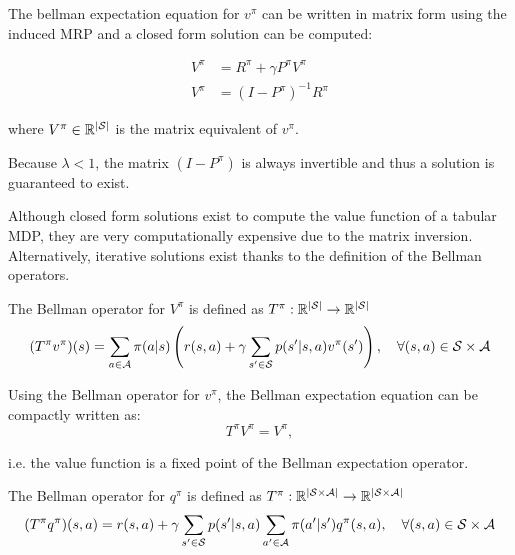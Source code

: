 The bellman expectation equation for $v^\pi$ can be written in matrix form using the induced MRP and a closed form solution can be computed:

\begin{align*}
    V^\pi &= R^\pi + \gamma P^\pi V^\pi \\
    V^\pi &= (I - P^\pi)^{-1} R^\pi
\end{align*}

where $V^\pi \in \mathbb{R}^{|\mathcal{S}|}$ is the matrix equivalent of $v^\pi$.

Because $\lambda < 1$, the matrix $(I - P^\pi)$ is always invertible and thus a solution is guaranteed to exist.


Although closed form solutions exist to compute the value function of a tabular MDP, they are very computationally expensive due to the matrix inversion.
Alternatively, iterative solutions exist thanks to the definition of the Bellman operators.


\begin{definition}
    The Bellman operator for $V^\pi$ is defined as $T^\pi : \mathbb{R}^{|\mathcal{S}|} \to \mathbb{R}^{|\mathcal{S}|}$
    \[(T^\pi v^\pi)(s) = \sum_{a \in \mathcal{A}}\pi(a|s)\left(r(s,a) + \gamma \sum_{s' \in \mathcal{S}}p(s'|s,a)v^\pi(s')\right),\quad \forall(s,a) \in \mathcal{S}\times\mathcal{A}\]
\end{definition}

Using the Bellman operator for $v^\pi$, the Bellman expectation equation can be compactly written as:
\begin{equation*}
    T^\pi V^\pi = V^\pi,
\end{equation*}

i.e. the value function is a fixed point of the Bellman expectation operator.


\begin{definition}
    The Bellman operator for $q^\pi$ is defined as $T^\pi : \mathbb{R}^{|\mathcal{S} \times \mathcal{A}|} \to \mathbb{R}^{|\mathcal{S} \times \mathcal{A}|}$
    \[(T^\pi q^\pi)(s, a) = r(s,a) + \gamma \sum_{s' \in \mathcal{S}}p(s'|s,a)\sum_{a' \in \mathcal{A}}\pi(a'|s')q^\pi(s,a),\quad \forall(s,a) \in \mathcal{S}\times\mathcal{A}\]
\end{definition}

